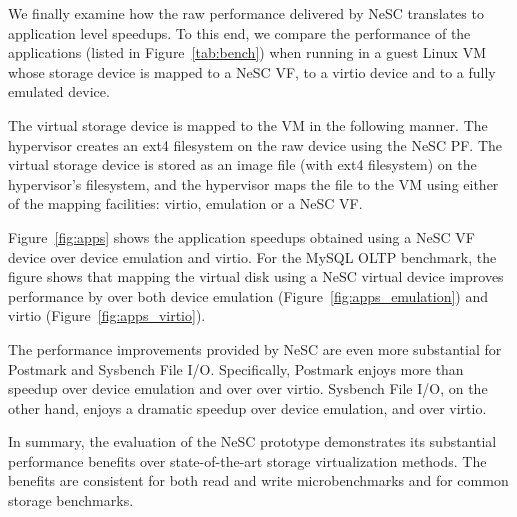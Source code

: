 We finally examine how the raw performance delivered by NeSC translates to application level speedups. To this end, we compare the performance of the  applications (listed in Figure~\ref{tab:bench}) when running in a guest Linux VM whose storage device is mapped to a NeSC VF, to a virtio device and to a fully emulated device.

The virtual storage device is mapped to the VM in the following manner. The hypervisor creates an ext4 filesystem on the raw device using the NeSC PF. The virtual storage device is stored as an image file (with ext4 filesystem) on  the hypervisor's filesystem, and the hypervisor maps the file to the VM using either of the mapping facilities: virtio, emulation or a NeSC VF.

Figure~\ref{fig:apps} shows the application speedups obtained using a NeSC VF device over device emulation and virtio. For the MySQL OLTP benchmark, the figure shows that mapping the virtual disk using a NeSC virtual device improves performance by  over both device emulation (Figure~\ref{fig:apps_emulation}) and virtio (Figure~\ref{fig:apps_virtio}).

The performance improvements provided by NeSC are even more substantial for Postmark and Sysbench File I/O.
Specifically, Postmark enjoys more than  speedup over device emulation and over  over virtio. Sysbench File I/O, on the other hand, enjoys a dramatic  speedup over device emulation, and  over virtio.

In summary, the evaluation of the NeSC prototype demonstrates its substantial performance benefits over state-of-the-art storage virtualization methods. The benefits are consistent for both read and write microbenchmarks and for common storage benchmarks.

